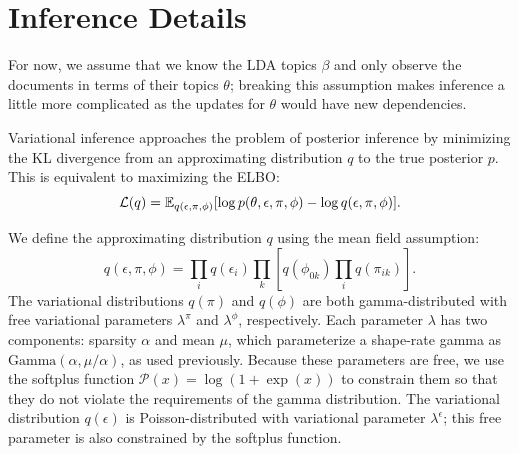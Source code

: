 \section{Inference Details}
\label{sec:appendix_inference}
For now, we assume that we know the LDA topics $\beta$ and only observe the documents in terms of their topics $\theta$; breaking this assumption makes inference a little more complicated as the updates for $\theta$ would have new dependencies.

Variational inference approaches the problem of posterior inference by minimizing the KL divergence from an approximating distribution $q$ to the true posterior $p$.
This is equivalent to maximizing the ELBO: \[\mathcal{L}(q)  = \mathbb{E}_{q(\epsilon, \pi, \phi)}[\log p(\theta,\epsilon,\pi,\phi) - \log q(\epsilon, \pi, \phi)].\]

We define the approximating distribution $q$ using the mean field assumption: \[q(\epsilon, \pi, \phi) = \prod_i q(\epsilon_{i})\prod_k\left[q(\phi_{0k})\prod_i q(\pi_{ik})\right].\]
The variational distributions $q(\pi)$ and $q(\phi)$ are both gamma-distributed with free variational parameters $\lambda^\pi$ and $\lambda^\phi$, respectively.  Each parameter $\lambda$ has two components: sparsity $\alpha$ and mean $\mu$, which parameterize a shape-rate gamma as $\mbox{Gamma}(\alpha,\mu/\alpha)$, as used previously. Because these parameters are free, we use the softplus function $\mathcal{P}(x) = \log(1+\exp(x))$ to constrain them so that they do not violate the requirements of the gamma distribution.
The variational distribution $q(\epsilon)$ is Poisson-distributed with variational parameter $\lambda^\epsilon$; this free parameter is also constrained by the softplus function.

